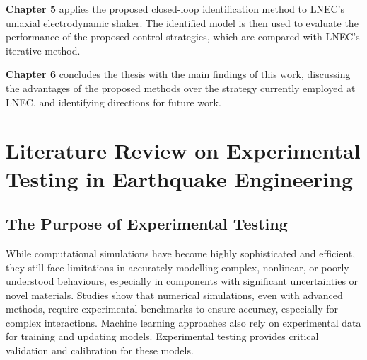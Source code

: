 \documentclass[  10pt, twoside]{report} %
\numberwithin{equation}{chapter}
\begin{document}
\textbf{Chapter 5} applies the proposed closed-loop identification method to LNEC's uniaxial electrodynamic shaker. The identified model is then used to evaluate the performance of the proposed control strategies, which are compared with LNEC's iterative method.

\textbf{Chapter 6} concludes the thesis with the main findings of this work, discussing the advantages of the proposed methods over the strategy currently employed at LNEC, and identifying directions for future work.

\clearpage

\chapter[Literature Review on Experimental Testing in Earthquake Engineering]{Literature Review on Experimental\\Testing in Earthquake Engineering}

\section{The Purpose of Experimental Testing} %
\hspace{\parindent}While computational simulations have become highly sophisticated and efficient, they still face limitations in accurately modelling complex, nonlinear, or poorly understood behaviours, especially in components with significant uncertainties or novel materials. 
Studies show that numerical simulations, even with advanced methods, require experimental benchmarks to ensure accuracy, especially for complex interactions. Machine learning approaches also rely on experimental data for training and updating models. Experimental testing provides critical validation and calibration for these models.
\end{document}
